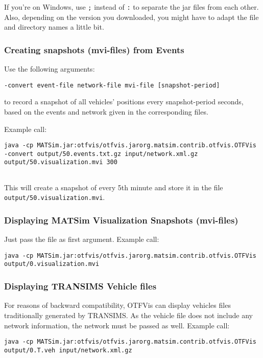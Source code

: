 \documentclass[a4paper,11pt]{report}
\begin{document}
If you're on Windows, use 
\texttt{;} instead of 
\texttt{:} to  separate the jar files from each other. Also, depending on the version  you downloaded, you might have to adapt the file and directory names a  little bit.  

\subsubsection{Creating snapshots (mvi-files) from Events}

Use the following arguments:
\begin{verbatim}
-convert event-file network-file mvi-file [snapshot-period]
\end{verbatim}

to record a snapshot of all vehicles' positions every snapshot-period  seconds, based on the events and network given in the corresponding  files.

Example call:
\begin{verbatim}
java -cp MATSim.jar:otfvis/otfvis.jarorg.matsim.contrib.otfvis.OTFVis -convert output/50.events.txt.gz input/network.xml.gz output/50.visualization.mvi 300


\end{verbatim}

This will create a snapshot of every 5th minute and store it in the file 
\texttt{output/50.visualization.mvi}.

\subsubsection{Displaying MATSim Visualization Snapshots (mvi-files)}

Just pass the file as first argument. Example call:
\begin{verbatim}
java -cp MATSim.jar:otfvis/otfvis.jarorg.matsim.contrib.otfvis.OTFVis output/0.visualization.mvi
\end{verbatim}

\subsubsection{Displaying TRANSIMS Vehicle files}

For reasons of backward compatibility, OTFVis can display vehicles  files traditionally generated by TRANSIMS. As the vehicle file does not  include any network information, the network must be passed as well.  Example call:
\begin{verbatim}
java -cp MATSim.jar:otfvis/otfvis.jarorg.matsim.contrib.otfvis.OTFVis output/0.T.veh input/network.xml.gz
\end{verbatim}
\end{document}
